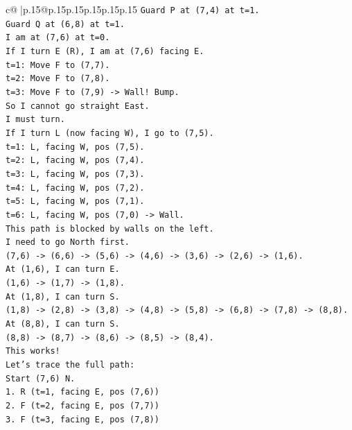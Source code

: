 \documentclass{article}
\begin{document}
{\begin{supertabular}{c@{$\;$}|p{.15\linewidth}@{}p{.15\linewidth}p{.15\linewidth}p{.15\linewidth}p{.15\linewidth}p{.15\linewidth}}
{{{\texttt{Guard P at (7,4) at t=1.} \\
\texttt{Guard Q at (6,8) at t=1.} \\
\texttt{I am at (7,6) at t=0.} \\
\texttt{If I turn E (R), I am at (7,6) facing E.} \\
\texttt{t=1: Move F to (7,7).} \\
\texttt{t=2: Move F to (7,8).} \\
\texttt{t=3: Move F to (7,9) {-}> Wall! Bump.} \\
\texttt{So I cannot go straight East.} \\
\texttt{I must turn.} \\
\texttt{If I turn L (now facing W), I go to (7,5).} \\
\texttt{t=1: L, facing W, pos (7,5).} \\
\texttt{t=2: L, facing W, pos (7,4).} \\
\texttt{t=3: L, facing W, pos (7,3).} \\
\texttt{t=4: L, facing W, pos (7,2).} \\
\texttt{t=5: L, facing W, pos (7,1).} \\
\texttt{t=6: L, facing W, pos (7,0) {-}> Wall.} \\
\texttt{This path is blocked by walls on the left.} \\
\texttt{I need to go North first.} \\
\texttt{(7,6) {-}> (6,6) {-}> (5,6) {-}> (4,6) {-}> (3,6) {-}> (2,6) {-}> (1,6).} \\
\texttt{At (1,6), I can turn E.} \\
\texttt{(1,6) {-}> (1,7) {-}> (1,8).} \\
\texttt{At (1,8), I can turn S.} \\
\texttt{(1,8) {-}> (2,8) {-}> (3,8) {-}> (4,8) {-}> (5,8) {-}> (6,8) {-}> (7,8) {-}> (8,8).} \\
\texttt{At (8,8), I can turn S.} \\
\texttt{(8,8) {-}> (8,7) {-}> (8,6) {-}> (8,5) {-}> (8,4).} \\
\texttt{This works!} \\
\texttt{Let's trace the full path:} \\
\texttt{Start (7,6) N.} \\
\texttt{1. R (t=1, facing E, pos (7,6))} \\
\texttt{2. F (t=2, facing E, pos (7,7))} \\
\texttt{3. F (t=3, facing E, pos (7,8))} \\
}}}
\end{supertabular}}
\end{document}
